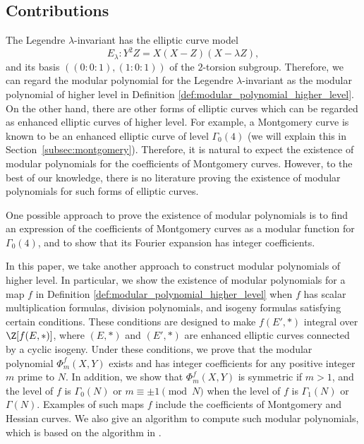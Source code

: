 \documentclass{amsart}
\theoremstyle{definition}
\theoremstyle{remark}
\numberwithin{equation}{section}
\begin{document}
\subsection{Contributions}
The Legendre $\lambda$-invariant has the elliptic curve model
\begin{equation}\label{eq:legendre_form}
    E_\lambda: Y^2Z = X(X - Z)(X - \lambda Z),
\end{equation}
and its basis $((0: 0: 1), (1: 0: 1))$ of the $2$-torsion subgroup.
Therefore, we can regard the modular polynomial for the Legendre $\lambda$-invariant
as the modular polynomial of higher level in Definition \ref{def:modular_polynomial_higher_level}.
On the other hand,
there are other forms of elliptic curves
which can be regarded as enhanced elliptic curves of higher level.
For example,
a Montgomery curve
is known to be an enhanced elliptic curve of level $\Gamma_0(4)$
(we will explain this in Section~\ref{subsec:montgomery}).
Therefore, it is natural to expect the existence of modular polynomials
for the coefficients of Montgomery curves.
However, to the best of our knowledge,
there is no literature proving the existence of modular polynomials
for such forms of elliptic curves.

One possible approach to prove the existence of modular polynomials
is to find an expression of the coefficients of Montgomery curves
as a modular function for $\Gamma_0(4)$,
and to show that its Fourier expansion has integer coefficients.

In this paper, we take another approach to construct modular polynomials of higher level.
In particular,
we show the existence of modular polynomials for a map $f$ in Definition \ref{def:modular_polynomial_higher_level}
when $f$ has scalar multiplication formulas, division polynomials, and isogeny formulas
satisfying certain conditions.
These conditions are designed to make $f(E', \ast)$ integral
over $\Z[f(E, \ast)]$, where $(E, \ast)$ and $(E', \ast)$ are enhanced elliptic curves
connected by a cyclic isogeny.
Under these conditions,
we prove that the modular polynomial $\Phi_m^f(X, Y)$
exists and has integer coefficients for any positive integer $m$ prime to $N$.
In addition,
we show that $\Phi_m^f(X, Y)$ is symmetric
if $m > 1$, and the level of $f$ is $\Gamma_0(N)$ or $m \equiv \pm 1 \pmod{N}$
when the level of $f$ is $\Gamma_1(N)$ or $\Gamma(N)$.
Examples of such maps $f$ include
the coefficients of Montgomery and Hessian curves.
We also give an algorithm to compute such modular polynomials,
which is based on the algorithm in \cite{deformation_Kunzweiler_2024}.
\end{document}
